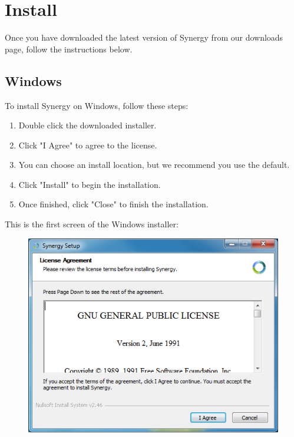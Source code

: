 \newcommand{\wizardhint}{
If this is your first installation, then the setup wizard should appear
when you first run Synergy. The wizard may also appear if we've changed
something or added a new feature.
}

\newcommand{\confighint}{
Once you have installed Synergy on all of your machines, skip to the
"Configure" section of this guide.
}

\section{Install}

Once you have downloaded the latest version of Synergy from our 
downloads page, follow the instructions below.

\subsection{Windows}

To install Synergy on Windows, follow these steps:

\begin{enumerate}
  \item Double click the downloaded installer.
  \item Click "I Agree" to agree to the license.
  \item You can choose an install location, but we recommend you use the default.
  \item Click "Install" to begin the installation.
  \item Once finished, click "Close" to finish the installation.
\end{enumerate}

This is the first screen of the Windows installer:

\begin{figure}[H]
\includegraphics[scale=.75]{graphics/windows-install.png}
\end{figure}

